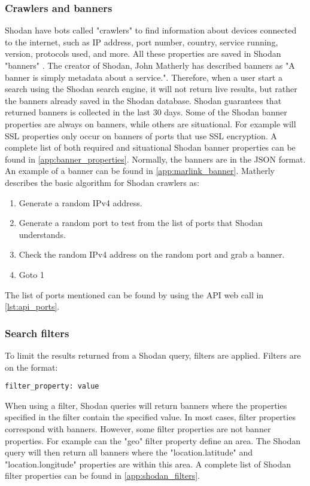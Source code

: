 \subsubsection{Crawlers and banners}
Shodan have bots called "crawlers" to find information about devices connected to the internet, such as IP address, port number, country, service running, version, protocols used, and more. 
All these properties are saved in Shodan "banners" . The creator of Shodan, John Matherly has described banners as "A banner is simply metadata about a service.". \cite{banner} 
Therefore, when a user start a search using the Shodan search engine, it will not return live results, but rather the banners already saved in the Shodan database. Shodan guarantees that returned banners is collected in the last 30 days.\cite{matherly_guide_to_shodan}
Some of the Shodan banner properties are always on banners, while others are situational. For example will SSL properties only occur on banners of ports that use SSL encryption. A complete list of both required and situational Shodan banner properties can be found in \cref{app:banner_properties}.
Normally, the banners are in the JSON format. An example of a banner can be found in \cref{app:marlink_banner}.
Matherly\cite{matherly_guide_to_shodan} describes the basic algorithm for Shodan crawlers as:
\begin{enumerate}
\setlength\itemsep{0em}
	\item Generate a random IPv4 address. 
	\item Generate a random port to test from the list of ports that Shodan understands.
	\item Check the random IPv4 address on the random port and grab a banner.
	\item Goto 1
\end{enumerate}
The list of ports mentioned can be found by using the API web call in \cref{lst:api_ports}.


\subsubsection{Search filters} \label{sec:filters}
To limit the results returned from a Shodan query, filters are applied. Filters are on the format:
\begin{lstlisting}
filter_property: value
\end{lstlisting}
When using a filter, Shodan queries will return banners where the properties specified in the filter contain the specified value. In most cases, filter properties correspond with banners. However, some filter properties are not banner properties. For example can the "geo" filter property define an area. The Shodan query will then return all banners where the "location.latitude" and "location.longitude" properties are within this area. A complete list of Shodan filter properties can be found in \cref{app:shodan_filters}.

